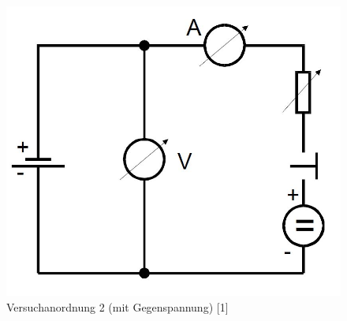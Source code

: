 	\begin{figure}[h]
		\begin{center}
		\includegraphics[scale=0.3]{pic3.jpg}
		\caption{Versuchanordnung 2 (mit Gegenspannung) [1]}
		\label{pic3}
		\end{center}	
	\end{figure}